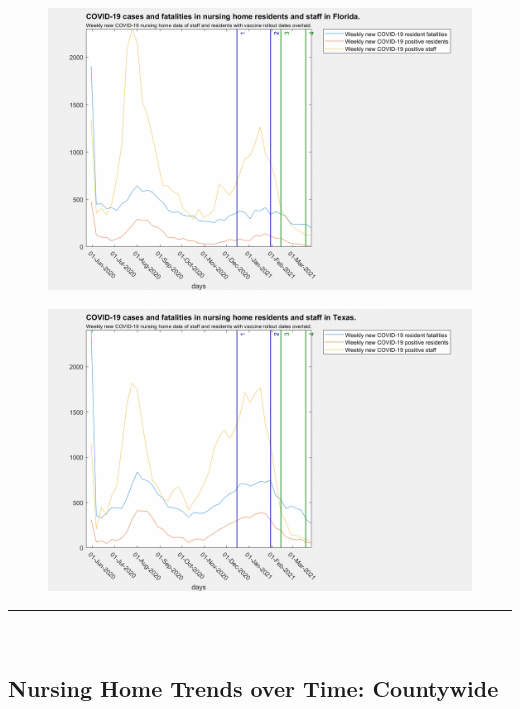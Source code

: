 \documentclass[twoside]{article}
\begin{document}
\begin{multicols}{2}
\begin{figure}[H]
	\includegraphics[width=\linewidth]{images/florida_nursing_home_with_vaccine.png}
	\caption{}
	\label{fig:images/florida_nursing_home_with_vaccineLabel}
\end{figure}

\begin{figure}[H]
	\includegraphics[width=\linewidth]{images/texas_nursing_home_with_vaccine.png}
	\caption{}
	\label{fig:images/texas_nursing_home_with_vaccineLabel}
\end{figure}
\rule{\linewidth}{0.5pt}\\
\subsection{Nursing Home Trends over Time: Countywide}


\end{multicols}
\end{document}
